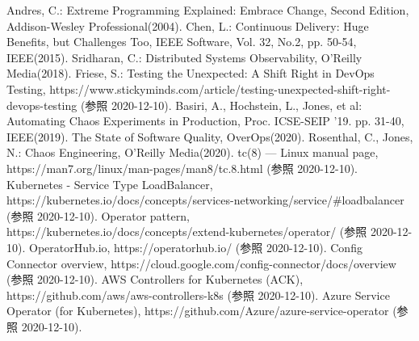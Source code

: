 \documentclass[12pt,a4j]{ujreport}
\begin{document}
\begin{thebibliography}{99}
     Andres, C.: Extreme Programming Explained: Embrace Change, Second Edition, Addison-Wesley Professional(2004).
     Chen, L.: Continuous Delivery: Huge Benefits, but Challenges Too, IEEE Software, Vol. 32, No.2, pp. 50-54, IEEE(2015).
     Sridharan, C.: Distributed Systems Observability, O'Reilly Media(2018).
     Friese, S.: Testing the Unexpected: A Shift Right in DevOps Testing, https://www.stickyminds.com/article/testing-unexpected-shift-right-devops-testing (参照 2020-12-10).
     Basiri, A., Hochstein, L., Jones, et al: Automating Chaos Experiments in Production, Proc. ICSE-SEIP '19. pp. 31-40, IEEE(2019).
     The State of Software Quality, OverOps(2020).
     Rosenthal, C., Jones, N.: Chaos Engineering, O'Reilly Media(2020).
     tc(8) — Linux manual page, https://man7.org/linux/man-pages/man8/tc.8.html (参照 2020-12-10).
     Kubernetes - Service Type LoadBalancer, https://kubernetes.io/docs/concepts/services-networking/service/\#loadbalancer (参照 2020-12-10).
     Operator pattern, https://kubernetes.io/docs/concepts/extend-kubernetes/operator/ (参照 2020-12-10).
     OperatorHub.io, https://operatorhub.io/ (参照 2020-12-10).
     Config Connector overview, https://cloud.google.com/config-connector/docs/overview (参照 2020-12-10).
     AWS Controllers for Kubernetes (ACK), https://github.com/aws/aws-controllers-k8s (参照 2020-12-10).
     Azure Service Operator (for Kubernetes), https://github.com/Azure/azure-service-operator (参照 2020-12-10).
\end{thebibliography}
\end{document}
